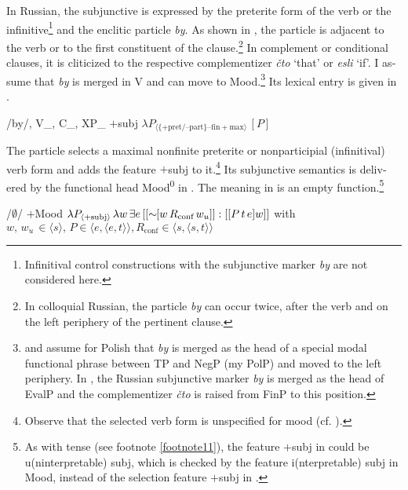 \documentclass[output=paper,colorlinks,citecolor=brown]{langscibook}
\begin{document}
\begin{otherlanguage}{english}
\noindent In Russian, the subjunctive is expressed by the preterite form of the verb or the infinitive\footnote{Infinitival control constructions with the subjunctive marker \textit{by} are not considered here.
} and the enclitic particle \textit{by}. As shown in , the particle is adjacent to the verb or to the first constituent of the clause.\footnote{In colloquial Russian, the particle \textit{by} can occur twice, after the verb and on the left periphery of the pertinent clause.
} In complement or conditional clauses, it is cliticized to the respective complementizer \textit{čto} `that' or \textit{esli} `if'. I assume that \textit{by} is merged in V and can move to Mood.\footnote{\textcite{Migdalski2006} and \textcite{Tomaszewicz2012} assume for Polish that \textit{by} is merged as the head of a special modal functional phrase between TP and NegP (my PolP) and moved to the left periphery. In \textcite{Ambar2016}, the Russian subjunctive marker \textit{by} is merged as the head of EvalP and the complementizer \textit{čto} is raised from FinP to this position.
} Its lexical entry is given in .
\largerpage

\begin{exe}
\ex	\label{ex:16:17}
\begin{xlist}
	\ex /by/, V\_, C\_, XP\_
    \ex $+$subj \label{nozyczki23}
    \ex $\lambda P_{\langle \{+\text{pret}/–\text{part}\}–\text{fin}+\text{max} \rangle} \, [P] $ \label{universum}
\end{xlist}
\end{exe}

\noindent The particle selects a maximal nonfinite preterite or nonparticipial (infinitival) verb form and adds the feature $+$subj to it.\footnote{Observe that the selected verb form is unspecified for mood (cf. ).} Its subjunctive semantics is delivered by the functional head Mood\textsuperscript{0} in . The meaning in  is an empty function.\footnote{As with tense (see footnote \ref{footnote11}), the feature $+$subj in  could be u(ninterpretable) subj, which is checked by the feature i(nterpretable) subj in Mood, instead of the selection feature $+$subj in .
}

\begin{exe}
\ex	\label{ex:16:18}
\begin{xlist}
\ex /$\emptyset$/
    \ex $+$Mood
    \ex $\lambda P_{\langle +\text{subj} \rangle} \, \lambda w \, \exists e \, [[\sim \negthinspace \negthinspace   [w \, R_\text{conf} \, w_u]]  :  [[P \, t \, e]w]]  $  \newline
    with $w, \, w_{u} \, \in \langle s \rangle, \, P \in \langle e, \langle e,t \rangle \rangle, R_\text{conf} \in \langle s, \langle s, t \rangle \rangle $ 
    \label{ex:16:18c}
\end{xlist}
\end{exe}


\end{otherlanguage}
\end{document}
